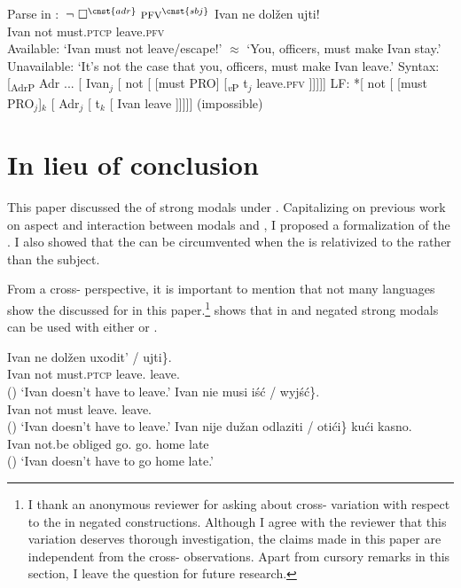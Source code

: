 \documentclass[output=paper,newtxmath,colorlinks,citecolor=brown]{langsci/langscibook}
\begin{document}
\ea Parse in :  $\,\neg\ \Box^{\cnst{adr}}\ \textsc{pfv}^{\cnst{sbj}}$ \label{detailsp2c}
	\ea \gll Ivan ne dolžen ujti! \\
	Ivan  not must.\textsc{ptcp} leave.\textsc{pfv} \\
	\glt Available: `Ivan must not leave/escape!' $\approx$ `You, officers, must make Ivan stay.' \\
	Unavailable: `It's not the case that you, officers, must make Ivan leave.'
	\ex Syntax:  [\textsubscript{AdrP} Adr ... [ Ivan$_j$  [ not [ [must PRO] [\textsubscript{\textit{v}P} t$_j$ leave.\textsc{pfv} ]]]]]
	\ex LF: *[ not [ [must PRO$_j$]$_k$ [ Adr$_j$ [ t$_k$ [ Ivan leave  ]]]]]	\hfill (impossible)
        \z \z


\section{In lieu of conclusion}\label{sect:conclusion}
This paper discussed the  of  strong   modals under . Capitalizing on previous work on  aspect and interaction between  modals and , I proposed a formalization of the . I also showed that the  can be circumvented when the   is relativized to the  rather than the subject.

From a cross- perspective, it is important to mention that not many  languages show the  discussed for  in this paper.\footnote{I thank an anonymous reviewer for asking about cross- variation with respect to the  in negated  constructions. Although I agree with the reviewer that this variation deserves thorough investigation, the claims made in this paper are independent from the cross- observations. Apart from cursory remarks in this section, I leave the question for future research.
}
 shows that in  and  negated strong  modals can be used with either  or .

\ea \label{crossslavdeon} \ea \gll Ivan ne dolžen \minsp{\{} uxodit' / \minsp{*} ujti\}. \\
	Ivan  not must.\textsc{ptcp} {} {leave.\im} {} {} {leave.\p} {} \\ \hfill ()
	\glt `Ivan doesn't have to leave.'
	\ex \gll Ivan nie musi \minsp{\{} iść / wyjść\}. \\
	Ivan not must {} {leave.\im} {} {leave.\p} {} \\ \hfill ()
	\glt `Ivan doesn't have to leave.'
	\ex \gll Ivan nije du\v zan \minsp{\{} odlaziti / otići\} kući kasno. \\
	Ivan not.be obliged {} {go.\im} {} {go.\p} home late \\ \hfill ()
	\glt `Ivan doesn't have to go home late.'
	\z \z
\end{document}
